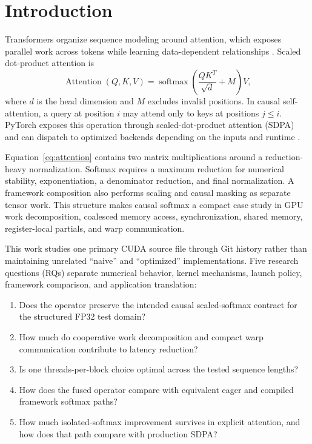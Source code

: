 \documentclass[twoside,twocolumn,10pt]{article}
\begin{document}
\section{Introduction}

Transformers organize sequence modeling around attention, which exposes
parallel work across tokens while learning data-dependent relationships
\cite{vaswani2017}. Scaled dot-product attention is
\begin{equation}
\operatorname{Attention}(Q,K,V)=
\operatorname{softmax}\!\left(\frac{QK^{T}}{\sqrt{d}}+M\right)V,
\label{eq:attention}
\end{equation}
where $d$ is the head dimension and $M$ excludes invalid positions. In causal
self-attention, a query at position $i$ may attend only to keys at positions
$j\le i$. PyTorch exposes this operation through scaled-dot-product attention
(SDPA) and can dispatch to optimized backends depending on the inputs and
runtime \cite{pytorch_sdpa}.

Equation~\ref{eq:attention} contains two matrix multiplications around a
reduction-heavy normalization. Softmax requires a maximum reduction for
numerical stability, exponentiation, a denominator reduction, and final
normalization. A framework composition also performs scaling and causal
masking as separate tensor work. This structure makes causal softmax a compact
case study in GPU work decomposition, coalesced memory access, synchronization,
shared memory, register-local partials, and warp communication.

This work studies one primary CUDA source file through Git history rather than
maintaining unrelated ``naive'' and ``optimized'' implementations. Five
research questions (RQs) separate numerical behavior, kernel mechanisms,
launch policy, framework comparison, and application translation:

\begin{enumerate}
\item[\textbf{RQ1}] Does the operator preserve the intended causal
scaled-softmax contract for the structured FP32 test domain?
\item[\textbf{RQ2}] How much do cooperative work decomposition and compact
warp communication contribute to latency reduction?
\item[\textbf{RQ3}] Is one threads-per-block choice optimal across the tested
sequence lengths?
\item[\textbf{RQ4}] How does the fused operator compare with equivalent eager
and compiled framework softmax paths?
\item[\textbf{RQ5}] How much isolated-softmax improvement survives in explicit
attention, and how does that path compare with production SDPA?
\end{enumerate}
\end{document}
